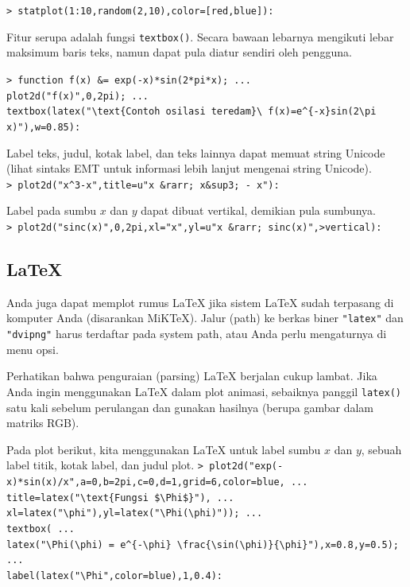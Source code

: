 \documentclass[11pt, a4paper]{article}
\newcommand{\emtcmd}[1]{\noindent\texttt{\textcolor{emtcommand}{>}\ #1}\par\smallskip}
\begin{document}
\emtcmd{statplot(1:10,random(2,10),color=[red,blue]):}

Fitur serupa adalah fungsi \texttt{textbox()}. Secara bawaan lebarnya mengikuti lebar maksimum baris teks, namun dapat pula diatur sendiri oleh pengguna.

\emtcmd{function f(x) \&= exp(-x)*sin(2*pi*x); ... \\
\hspace*{1em} plot2d("f(x)",0,2pi); ... \\
\hspace*{1em} textbox(latex("\textbackslash text\{Contoh osilasi teredam\}\textbackslash\ f(x)=e\^{}\{-x\}sin(2\textbackslash pi x)"),w=0.85):}

Label teks, judul, kotak label, dan teks lainnya dapat memuat string Unicode (lihat sintaks EMT untuk informasi lebih lanjut mengenai string Unicode).
\emtcmd{plot2d("x\^{}3-x",title=u"x \&rarr; x\&sup3; - x"):}

Label pada sumbu $x$ dan $y$ dapat dibuat vertikal, demikian pula sumbunya.
\emtcmd{plot2d("sinc(x)",0,2pi,xl="x",yl=u"x \&rarr; sinc(x)",>vertical):}

\subsection*{LaTeX}

Anda juga dapat memplot rumus LaTeX jika sistem LaTeX sudah terpasang di komputer Anda (disarankan MiKTeX). Jalur (path) ke berkas biner \texttt{"latex"} dan \texttt{"dvipng"} harus terdaftar pada system path, atau Anda perlu mengaturnya di menu opsi.

Perhatikan bahwa penguraian (parsing) LaTeX berjalan cukup lambat. Jika Anda ingin menggunakan LaTeX dalam plot animasi, sebaiknya panggil \texttt{latex()} satu kali sebelum perulangan dan gunakan hasilnya (berupa gambar dalam matriks RGB).

Pada plot berikut, kita menggunakan LaTeX untuk label sumbu $x$ dan $y$, sebuah label titik, kotak label, dan judul plot.
\emtcmd{plot2d("exp(-x)*sin(x)/x",a=0,b=2pi,c=0,d=1,grid=6,color=blue, ... \\
\hspace*{1em} title=latex("\textbackslash text\{Fungsi \$\textbackslash Phi\$\}"), ... \\
\hspace*{1em} xl=latex("\textbackslash phi"),yl=latex("\textbackslash Phi(\textbackslash phi)")); ... \\
\hspace*{1em} textbox( ... \\
\hspace*{2em} latex("\textbackslash Phi(\textbackslash phi) = e\^{}\{-\textbackslash phi\} \textbackslash frac\{\textbackslash sin(\textbackslash phi)\}\{\textbackslash phi\}"),x=0.8,y=0.5); ... \\
\hspace*{1em} label(latex("\textbackslash Phi",color=blue),1,0.4):}
\end{document}
